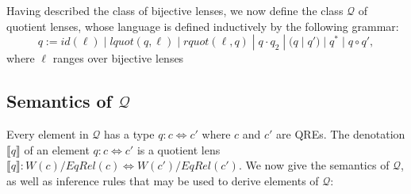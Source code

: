 \documentclass{svproc}
\begin{document}
Having described the class of bijective lenses, we now define the class
$\mathcal{Q}$ of quotient lenses, whose language is defined inductively by the
following grammar:
$$ q := id(\ell) \; | \; lquot(q, \ell) \; | \; rquot(\ell, q) \; | \; q
\cdot q_2 \; | \; (q \; | \; q') \; | \; q^* \; | \; q \circ q',$$
where $\ell$ ranges over bijective lenses 
\subsection{Semantics of $\mathcal{Q}$}
Every element in $\mathcal{Q}$ has a type $q :
c \Longleftrightarrow c'$ where $c$ and $c'$ are QREs. The denotation
$\llbracket q \rrbracket$ of an element $q : c \Longleftrightarrow c'$ is a
quotient lens $\llbracket q \rrbracket :
W(c)/{EqRel(c)} \Longleftrightarrow W(c')/{EqRel(c')}$. We now give the
semantics of $\mathcal{Q}$, as well as inference rules that may be used to
derive elements of $\mathcal{Q}$:
\end{document}
